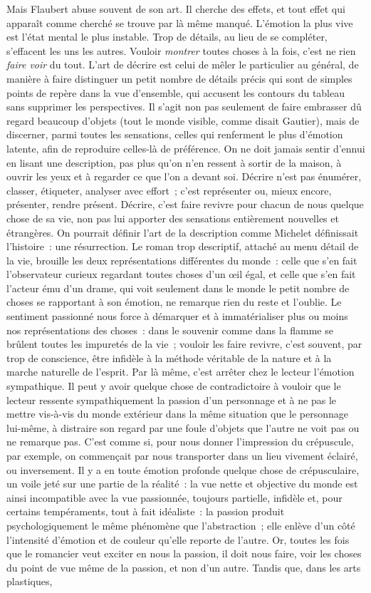 \documentclass[french,twoside]{book} %
\begin{document}
\noindent Mais Flaubert abuse souvent de son art. Il cherche des effets, et tout effet qui apparaît comme cherché se trouve par là même manqué. L’émotion la plus vive est l’état mental le plus instable. Trop de détails, au lieu de se compléter, s’effacent les uns les autres. Vouloir \emph{montrer} toutes choses à la fois, c’est ne rien \emph{faire voir} du tout. L’art de décrire est celui de mêler le particulier au général, de manière à faire distinguer un petit nombre de détails précis qui sont de simples points de repère dans la vue d’ensemble, qui accusent les contours du tableau sans supprimer les perspectives. Il s’agit non pas seulement de faire embrasser dû regard beaucoup d’objets (tout le monde visible, comme disait Gautier), mais de discerner, parmi toutes les sensations, celles qui renferment le plus d’émotion latente, afin de reproduire celles-là de préférence. On ne doit jamais sentir d’ennui en lisant une description, pas plus qu’on n’en ressent à sortir de la maison, à ouvrir les yeux et à regarder ce que l’on a devant soi. Décrire n’est pas énumérer, classer, étiqueter, analyser avec effort ; c’est représenter ou, mieux encore, présenter, rendre présent. Décrire, c’est faire revivre pour chacun de nous quelque chose de sa vie, non pas lui apporter des sensations entièrement nouvelles et étrangères. On pourrait définir l’art de la description comme Michelet définissait l’histoire : une résurrection. Le roman trop descriptif, attaché au menu détail de la vie, brouille les deux représentations différentes du monde : celle que s’en fait l’observateur curieux regardant toutes choses d’un œil égal, et celle que s’en fait l’acteur ému d’un drame, qui voit seulement dans le monde le petit nombre de choses se rapportant à son émotion, ne remarque rien du reste et l’oublie. Le sentiment passionné nous force à démarquer et à immatérialiser plus ou moins nos représentations des choses : dans le souvenir comme dans la flamme se brûlent toutes les impuretés de la vie ; vouloir les faire revivre, c’est souvent, par trop de conscience, être infidèle à la méthode véritable de la nature et à la marche naturelle de l’esprit. Par là même, c’est arrêter chez le lecteur l’émotion sympathique. Il peut y avoir quelque chose de contradictoire à vouloir que le lecteur ressente sympathiquement la passion d’un personnage et à ne pas le mettre vis-à-vis du monde extérieur dans la même situation que le personnage lui-même, à distraire son regard par une foule d’objets que l’autre ne voit pas ou ne remarque pas. C’est comme si, pour nous donner l’impression du crépuscule, par exemple, on commençait par nous transporter dans un lieu vivement éclairé, ou inversement. Il y a en toute émotion profonde quelque chose de crépusculaire, un voile jeté sur une partie de la réalité : la vue nette et objective du monde est ainsi incompatible avec la vue passionnée, toujours partielle, infidèle et, pour certains tempéraments, tout à fait idéaliste : la passion produit psychologiquement le même phénomène que l’abstraction ; elle enlève d’un côté l’intensité d’émotion et de couleur qu’elle reporte de l’autre. Or, toutes les fois que le romancier veut exciter en nous la passion, il doit nous faire, voir les choses du point de vue même de la passion, et non d’un autre. Tandis que, dans les arts plastiques, 
\end{document}
